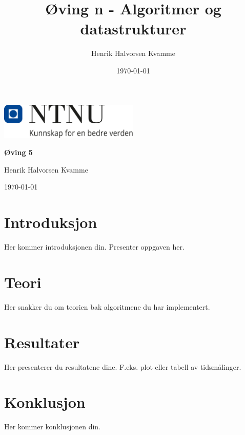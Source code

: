 \documentclass[12pt,a4paper]{article}
\title{Øving n - Algoritmer og datastrukturer}
\author{Henrik Halvorsen Kvamme}
\date{\today}
\begin{document}
\begin{center}
    \includegraphics[width=0.5\textwidth]{../images/NTNU_Logo.png}
    
    \vspace{1.5em}  %
    
    {\LARGE \textbf{Øving 5} \\[0.5em] }  %
    \vspace{1em}  %
    
    {\large Henrik Halvorsen Kvamme}\\  %
    \vspace{0.5em}  %
    
    {\today}  %
\end{center}

\vspace{2em}

\tableofcontents

\newpage

\section{Introduksjon}
Her kommer introduksjonen din. Presenter oppgaven her.

\section{Teori}
Her snakker du om teorien bak algoritmene du har implementert.

\section{Resultater}
Her presenterer du resultatene dine. F.eks. plot eller tabell av tidsmålinger.

\section{Konklusjon}
Her kommer konklusjonen din.
\end{document}
